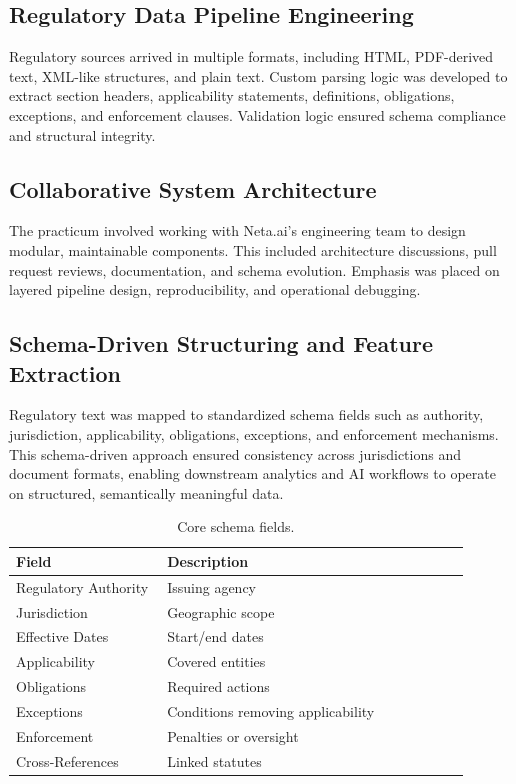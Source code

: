 \documentclass[sigconf]{acmart}
\begin{document}
\subsection{Regulatory Data Pipeline Engineering}
Regulatory sources arrived in multiple formats, including HTML, PDF-derived text, XML-like structures, and plain text. Custom parsing logic was developed to extract section headers, applicability statements, definitions, obligations, exceptions, and enforcement clauses. Validation logic ensured schema compliance and structural integrity.

\subsection{Collaborative System Architecture}
The practicum involved working with Neta.ai’s engineering team to design modular, maintainable components. This included architecture discussions, pull request reviews, documentation, and schema evolution. Emphasis was placed on layered pipeline design, reproducibility, and operational debugging.

\subsection{Schema-Driven Structuring and Feature Extraction}
Regulatory text was mapped to standardized schema fields such as authority, jurisdiction, applicability, obligations, exceptions, and enforcement mechanisms. This schema-driven approach ensured consistency across jurisdictions and document formats, enabling downstream analytics and AI workflows to operate on structured, semantically meaningful data.

\begin{table}[h]
\centering
\begin{tabular}{p{0.3\linewidth} p{0.6\linewidth}}
\toprule
\textbf{Field} & \textbf{Description} \\
\midrule
Regulatory Authority & Issuing agency \\
Jurisdiction & Geographic scope \\
Effective Dates & Start/end dates \\
Applicability & Covered entities \\
Obligations & Required actions \\
Exceptions & Conditions removing applicability \\
Enforcement & Penalties or oversight \\
Cross-References & Linked statutes \\
\bottomrule
\end{tabular}
\caption{Core schema fields.}
\end{table}
\end{document}
